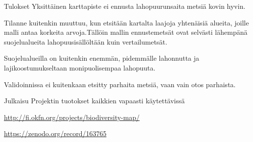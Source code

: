 \documentclass{beamer}
\begin{document}
\begin{frame}{Tulokset}
Yksittäinen karttapiste ei ennusta lahopuurunsaita metsiä kovin hyvin.

Tilanne kuitenkin muuttuu, kun etsitään kartalta laajoja yhtenäisiä alueita, joille malli antaa korkeita arvoja.Tällöin mallin ennustemetsät ovat selvästi lähempänä suojelualueita lahopuusisällöltään kuin vertailumetsät.

Suojelualueilla on kuitenkin enemmän, pidemmälle lahonnutta ja lajikoostumukseltaan monipuolisempaa lahopuuta.

Validoinnissa ei kuitenkaan etsitty parhaita metsiä, vaan vain otos parhaista.
\end{frame}

\begin{frame}{Julkaisu}
  Projektin tuotokset kaikkien vapaasti käytettävissä
  
  \url{http://fi.okfn.org/projects/biodiversity-map/}

  \url{https://zenodo.org/record/163765}
\end{frame}
\end{document}
